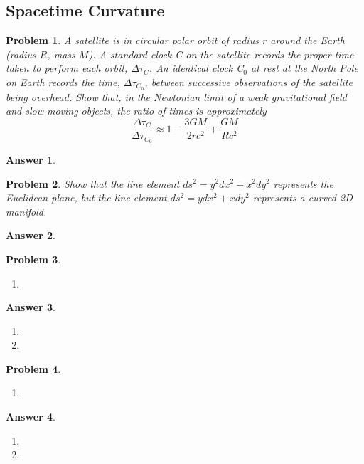 \documentclass[a4paper]{article}
\newtheorem{ans}{Answer}[subsection]
\theoremstyle{new}
\newtheorem{qns}{Problem}[section]
\begin{document}
\subsection*{Spacetime Curvature}
\begin{qns}
A satellite is in circular polar orbit of radius $r$ around the Earth (radius $R$, mass $M$). A standard clock C on the satellite records the proper time taken to perform each orbit, $\Delta\tau_C$. An identical clock C$_0$ at rest at the North Pole on Earth records the time, $\Delta\tau_{C_0}$, between successive observations of the satellite being overhead. Show that, in the Newtonian limit of a weak gravitational field and slow-moving objects, the ratio of times is approximately
$$\frac{\Delta\tau_C}{\Delta\tau_{C_0}}\approx 1-\frac{3GM}{2rc^2}+\frac{GM}{Rc^2}$$
\end{qns}
\begin{ans}
\end{ans}
\begin{qns} 
Show that the line element $ds^2 = y^2 dx^2 + x^2 dy^2$ represents the Euclidean plane, but the line element $ds^2 = y dx^2 + x dy^2$ represents a curved 2D manifold.
\end{qns}
\begin{ans}

\end{ans}
\newpage
\begin{qns}\leavevmode
\begin{enumerate}[label=(\alph*)]
\item 

\end{enumerate}
\end{qns}
\begin{ans}\leavevmode
\begin{enumerate}[label=(\alph*)]
\item

\item 
\end{enumerate}
\end{ans}
\begin{qns}\leavevmode
\begin{enumerate}[label=(\alph*)]
\item 

\end{enumerate}
\end{qns}
\begin{ans}\leavevmode
\begin{enumerate}[label=(\alph*)]
\item

\item 
\end{enumerate}
\end{ans}
\end{document}
